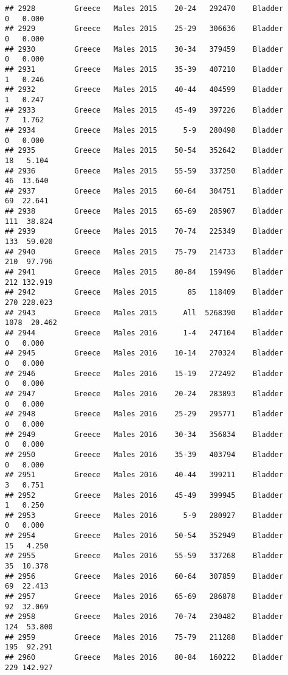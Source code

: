 \documentclass[
]{article}
\begin{document}
\begin{verbatim}
## 2928         Greece   Males 2015    20-24   292470    Bladder      0   0.000
## 2929         Greece   Males 2015    25-29   306636    Bladder      0   0.000
## 2930         Greece   Males 2015    30-34   379459    Bladder      0   0.000
## 2931         Greece   Males 2015    35-39   407210    Bladder      1   0.246
## 2932         Greece   Males 2015    40-44   404599    Bladder      1   0.247
## 2933         Greece   Males 2015    45-49   397226    Bladder      7   1.762
## 2934         Greece   Males 2015      5-9   280498    Bladder      0   0.000
## 2935         Greece   Males 2015    50-54   352642    Bladder     18   5.104
## 2936         Greece   Males 2015    55-59   337250    Bladder     46  13.640
## 2937         Greece   Males 2015    60-64   304751    Bladder     69  22.641
## 2938         Greece   Males 2015    65-69   285907    Bladder    111  38.824
## 2939         Greece   Males 2015    70-74   225349    Bladder    133  59.020
## 2940         Greece   Males 2015    75-79   214733    Bladder    210  97.796
## 2941         Greece   Males 2015    80-84   159496    Bladder    212 132.919
## 2942         Greece   Males 2015       85   118409    Bladder    270 228.023
## 2943         Greece   Males 2015      All  5268390    Bladder   1078  20.462
## 2944         Greece   Males 2016      1-4   247104    Bladder      0   0.000
## 2945         Greece   Males 2016    10-14   270324    Bladder      0   0.000
## 2946         Greece   Males 2016    15-19   272492    Bladder      0   0.000
## 2947         Greece   Males 2016    20-24   283893    Bladder      0   0.000
## 2948         Greece   Males 2016    25-29   295771    Bladder      0   0.000
## 2949         Greece   Males 2016    30-34   356834    Bladder      0   0.000
## 2950         Greece   Males 2016    35-39   403794    Bladder      0   0.000
## 2951         Greece   Males 2016    40-44   399211    Bladder      3   0.751
## 2952         Greece   Males 2016    45-49   399945    Bladder      1   0.250
## 2953         Greece   Males 2016      5-9   280927    Bladder      0   0.000
## 2954         Greece   Males 2016    50-54   352949    Bladder     15   4.250
## 2955         Greece   Males 2016    55-59   337268    Bladder     35  10.378
## 2956         Greece   Males 2016    60-64   307859    Bladder     69  22.413
## 2957         Greece   Males 2016    65-69   286878    Bladder     92  32.069
## 2958         Greece   Males 2016    70-74   230482    Bladder    124  53.800
## 2959         Greece   Males 2016    75-79   211288    Bladder    195  92.291
## 2960         Greece   Males 2016    80-84   160222    Bladder    229 142.927

\end{verbatim}
\end{document}
